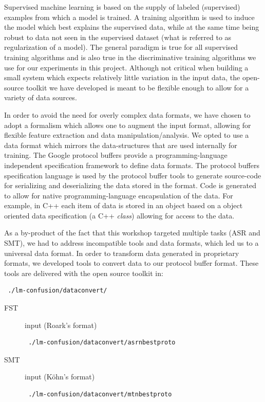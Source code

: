 \documentclass[a4paper]{article}
\begin{document}
Supervised machine learning is based on the supply of labeled (supervised)
examples from which a model is trained.  A training algorithm is used to induce
the model which best explains the supervised data, while at the same time being
robust to data not seen in the supervised dataset (what is referred to as
regularization of a model).  The general paradigm is true for all supervised
training algorithms and is also true in the discriminative training algorithms
we use for our experiments in this project. Although not critical when building
a small system which expects relatively little variation in the input data, the
open-source toolkit we have developed is meant to be flexible enough to allow
for a variety of data sources.

In order to avoid the need for overly complex data formats, we have
chosen to adopt a formalism which allows one to augment the input
format, allowing for flexible feature extraction and data manipulation/analysis.
We opted to use a data format which mirrors the data-structures that
are used internally for training. The Google protocol buffers\cite{protobuf}
provide a programming-language independent specification framework
to define data formats. The protocol buffers specification language
is used by the protocol buffer tools to generate source-code for serializing
and deserializing the data stored in the format. Code is generated
to allow for native programming-language encapsulation of the data.
For example, in C++ each item of data is stored in an object based
on a object oriented data specification (a C++ \emph{class}) allowing
for access to the data.

As a by-product of the fact that this workshop targeted multiple tasks
(ASR and SMT), we had to address incompatible tools and data formats,
which led us to a universal data format. In order to transform
data generated in proprietary formats, we developed
tools to convert data to our protocol buffer format. These tools are
delivered with the open source toolkit in:
\begin{verbatim} ./lm-confusion/dataconvert/
\end{verbatim} 
\begin{description}
\item [{FST}] input (Roark's format)
\begin{verbatim} ./lm-confusion/dataconvert/asrnbestproto
\end{verbatim} 
\item [{SMT}] input (Köhn's format)
\begin{verbatim} ./lm-confusion/dataconvert/mtnbestproto
\end{verbatim} 
\end{description}
\end{document}
